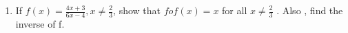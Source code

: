 
\begin{enumerate}

\item If $f(x)=\frac{4x+3}{6x-4}, x \neq \frac{2}{3}$, show that $fof(x) = x$ for all $x \neq \frac{2}{3}$ . Also , find the inverse of f.
    
 \end{enumerate}

